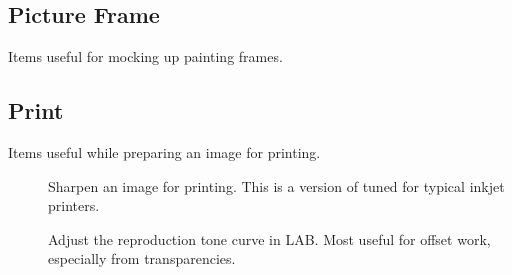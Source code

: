 \subsection{Picture Frame}

Items useful for mocking up painting frames.

\subsection{Print}

Items useful while preparing an image for printing.

\begin{description}

\item[]
	Sharpen an image for printing. This is a version of
	 tuned for typical
	inkjet printers.

\item[]
	Adjust the reproduction tone curve in LAB. Most useful for offset
	work, especially from transparencies.

\end{description}

